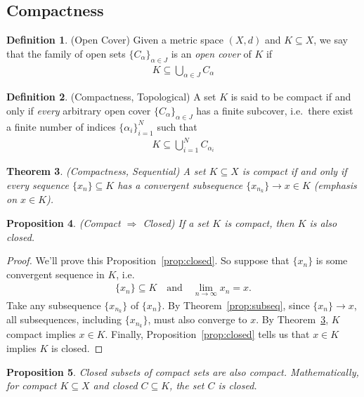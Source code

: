 \documentclass[12pt]{article}
\numberwithin{equation}{section} %
\theoremstyle{plain}
\newtheorem{thm}{Theorem}[section]
\newtheorem{prop}[thm]{Proposition}
\theoremstyle{definition}
\newtheorem{defn}[thm]{Definition}
\theoremstyle{remark}
\begin{document}
\subsection{Compactness}

\begin{defn}{(Open Cover)}
Given a metric space $(X,d)$ and $K\subseteq X$, we say that the family
of open sets $\{C_\alpha\}_{\alpha \in J}$ is an \emph{open cover} of
$K$ if
\begin{align*}
  K \subseteq \bigcup_{\alpha \in J} C_\alpha
\end{align*}
\end{defn}

\begin{defn}{(Compactness, Topological)}
A set $K$ is said to be compact if and only if \emph{every} arbitrary
open cover $\{C_\alpha\}_{\alpha \in J}$ has a finite subcover, i.e.\
there exist a finite number of indices $\{\alpha_i\}_{i=1}^N$ such that
\begin{align*}
  K \subseteq \bigcup_{i=1}^N C_{\alpha_i}
\end{align*}
\end{defn}

\begin{thm}{\emph{(Compactness, Sequential)}}
\label{thm:compact}
A set $K\subseteq X$ is compact if and only if every sequence
$\{x_n\}\subseteq K$ has a convergent subsequence $\{x_{n_k}\}
\rightarrow x \in K$ (emphasis on $x\in K$).
\end{thm}

\begin{prop}{\emph{(Compact $\Rightarrow$ Closed)}}
\label{prop:compact-closed}
If a set $K$ is compact, then $K$ is also closed.
\end{prop}
\begin{proof}
We'll prove this Proposition~\ref{prop:closed}. So suppose that
$\{x_n\}$ is some convergent sequence in $K$, i.e.
\begin{align*}
  \{x_n\} \subseteq K
  \quad \text{and}\quad
  \lim_{n\rightarrow \infty} x_n=x.
\end{align*}
Take any subsequence $\{x_{n_k}\}$ of $\{x_n\}$.
By Theorem~\ref{prop:subseq}, since $\{x_n\}\rightarrow x$, all
subsequences, including $\{x_{n_k}\}$, must also converge to $x$. By
Theorem~\ref{thm:compact}, $K$ compact implies $x\in K$.  Finally,
Proposition~\ref{prop:closed} tells us that $x\in K$ implies $K$ is
closed.
\end{proof}

\begin{prop}
Closed subsets of compact sets are also compact. Mathematically, for
compact $K\subseteq X$ and closed $C \subseteq K$, the set $C$ is
closed.
\end{prop}
\end{document}
